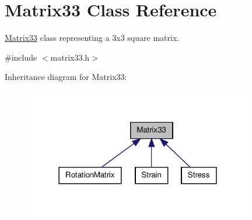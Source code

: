 \hypertarget{classMatrix33}{\section{\-Matrix33 \-Class \-Reference}
\label{de/d82/classMatrix33}
}


\hyperlink{classMatrix33}{\-Matrix33} class representing a 3x3 square matrix.  




{\ttfamily \#include $<$matrix33.\-h$>$}



\-Inheritance diagram for \-Matrix33\-:
\nopagebreak
\begin{figure}[H]
\begin{center}
\leavevmode
\includegraphics[width=282pt]{dc/dfe/classMatrix33__inherit__graph}
\end{center}
\end{figure}
